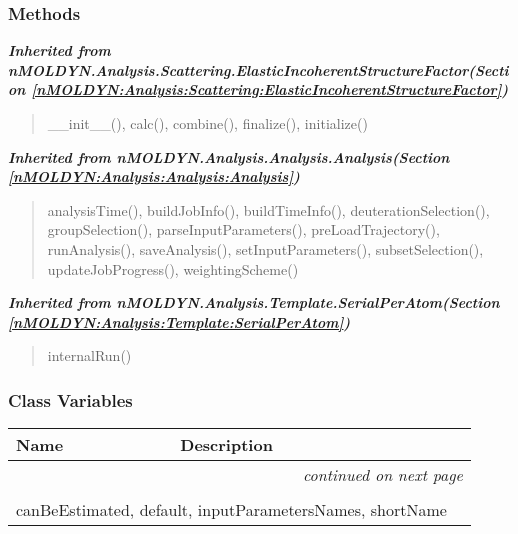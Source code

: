 
  \subsubsection{Methods}


\large{\textbf{\textit{Inherited from nMOLDYN.Analysis.Scattering.ElasticIncoherentStructureFactor\textit{(Section \ref{nMOLDYN:Analysis:Scattering:ElasticIncoherentStructureFactor})}}}}

\begin{quote}
\_\_init\_\_(), calc(), combine(), finalize(), initialize()
\end{quote}

\large{\textbf{\textit{Inherited from nMOLDYN.Analysis.Analysis.Analysis\textit{(Section \ref{nMOLDYN:Analysis:Analysis:Analysis})}}}}

\begin{quote}
analysisTime(), buildJobInfo(), buildTimeInfo(), deuterationSelection(), groupSelection(), parseInputParameters(), preLoadTrajectory(), runAnalysis(), saveAnalysis(), setInputParameters(), subsetSelection(), updateJobProgress(), weightingScheme()
\end{quote}

\large{\textbf{\textit{Inherited from nMOLDYN.Analysis.Template.SerialPerAtom\textit{(Section \ref{nMOLDYN:Analysis:Template:SerialPerAtom})}}}}

\begin{quote}
internalRun()
\end{quote}


  \subsubsection{Class Variables}

    \vspace{-1cm}
\hspace{\varindent}\begin{longtable}{|p{\varnamewidth}|p{\vardescrwidth}|l}
\cline{1-2}
\cline{1-2} \centering \textbf{Name} & \centering \textbf{Description}& \\
\cline{1-2}
\endhead\cline{1-2}\multicolumn{3}{r}{\small\textit{continued on next page}}\\\endfoot\cline{1-2}
\endlastfoot\multicolumn{2}{|l|}{\textit{Inherited from nMOLDYN.Analysis.Scattering.ElasticIncoherentStructureFactor \textit{(Section \ref{nMOLDYN:Analysis:Scattering:ElasticIncoherentStructureFactor})}}}\\
\multicolumn{2}{|p{\varwidth}|}{\raggedright canBeEstimated, default, inputParametersNames, shortName}\\
\cline{1-2}
\end{longtable}

